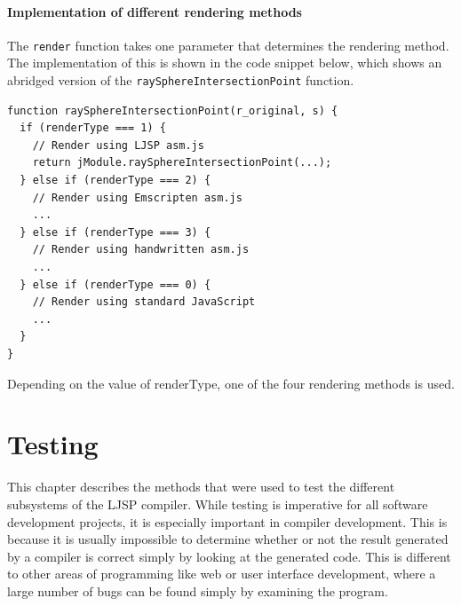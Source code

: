 \documentclass[11pt]{report}
\begin{document}
\subsubsection{Implementation of different rendering methods}

The \texttt{render} function takes one parameter that determines the rendering method. The implementation of this is shown in the code snippet below, which shows an abridged version of the \texttt{raySphereIntersectionPoint} function.

\begin{lstlisting}
function raySphereIntersectionPoint(r_original, s) {
  if (renderType === 1) {
    // Render using LJSP asm.js
    return jModule.raySphereIntersectionPoint(...);
  } else if (renderType === 2) {
    // Render using Emscripten asm.js
    ...
  } else if (renderType === 3) {
    // Render using handwritten asm.js
    ...
  } else if (renderType === 0) {
    // Render using standard JavaScript
    ...
  }
}
\end{lstlisting}

Depending on the value of renderType, one of the four rendering methods is used.









\chapter{Testing}
This chapter describes the methods that were used to test the different subsystems of the LJSP compiler. While testing is imperative for all software development projects, it is especially important in compiler development. This is because it is usually impossible to determine whether or not the result generated by a compiler is correct simply by looking at the generated code. This is different to other areas of programming like web or user interface development, where a large number of bugs can be found simply by examining the program. 
\end{document}
